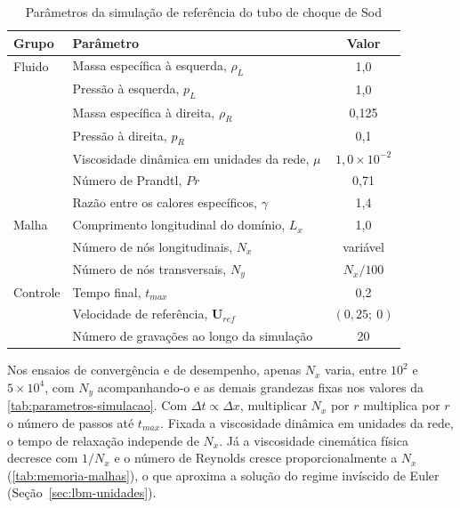 \begin{table}[H]
    \centering
    \caption{Parâmetros da simulação de referência do tubo de choque de Sod}
    \label{tab:parametros-simulacao}
    \small
    \begin{tabular}{llc}
        \toprule
        Grupo & Parâmetro & Valor \\
        \midrule
        Fluido & Massa específica à esquerda, $\rho_L$ & 1{,}0 \\
         & Pressão à esquerda, $p_L$ & 1{,}0 \\
         & Massa específica à direita, $\rho_R$ & 0{,}125 \\
         & Pressão à direita, $p_R$ & 0{,}1 \\
         & Viscosidade dinâmica em unidades da rede, $\mu$ & $1{,}0 \times 10^{-2}$ \\
         & Número de Prandtl, $Pr$ & 0{,}71 \\
         & Razão entre os calores específicos, $\gamma$ & 1{,}4 \\
        \midrule
        Malha & Comprimento longitudinal do domínio, $L_x$ & 1{,}0 \\
         & Número de nós longitudinais, $N_x$ & variável \\
         & Número de nós transversais, $N_y$ & $N_x/100$ \\
        \midrule
        Controle & Tempo final, $t_{max}$ & 0{,}2 \\
         & Velocidade de referência, $\mathbf{U}_{ref}$ & $(0{,}25;\ 0)$ \\
         & Número de gravações ao longo da simulação & 20 \\
        \bottomrule
    \end{tabular}
\end{table}

Nos ensaios de convergência e de desempenho, apenas $N_x$ varia, entre $10^2$ e $5 \times 10^4$, com $N_y$ acompanhando-o e as demais grandezas fixas nos valores da \autoref{tab:parametros-simulacao}.
Com $\Delta t \propto \Delta x$, multiplicar $N_x$ por $r$ multiplica por $r$ o número de passos até $t_{max}$.
Fixada a viscosidade dinâmica em unidades da rede, o tempo de relaxação independe de $N_x$.
Já a viscosidade cinemática física decresce com $1/N_x$ e o número de Reynolds cresce proporcionalmente a $N_x$ (\autoref{tab:memoria-malhas}), o que aproxima a solução do regime invíscido de Euler (Seção~\ref{sec:lbm-unidades}).

